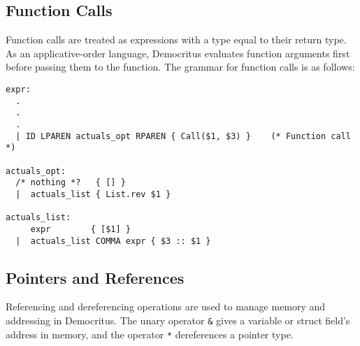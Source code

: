   \subsection{Function Calls}
    Function calls are treated as expressions with a type equal to their return type. As an applicative-order language, Democritus evaluates function arguments first before passing them to the function. The grammar for function calls is as follows:

    \begin{verbatim}
expr:
  .
  .
  .
  | ID LPAREN actuals_opt RPAREN { Call($1, $3) }    (* Function call *)

actuals_opt:
  /* nothing *?   { [] }
  |  actuals_list { List.rev $1 }

actuals_list:
     expr        { [$1] }
  |  actuals_list COMMA expr { $3 :: $1 }
    \end{verbatim}


  \subsection{Pointers and References}
		Referencing and dereferencing operations are used to manage memory and addressing in Democritus. The unary operator \texttt{\&} gives a variable or struct field's address in memory, and the operator \texttt{*} dereferences a pointer type.
	
  \iffalse
	\subsection{Array access}
		Array access is done with \texttt{[\textit{i}]} where \textit{i} is the index being accessed. 
  \fi


